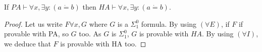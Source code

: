 \begin{theoreme}
    If $PA\vdash \forall x,\exists y:(a\dot{=}b)$ then $HA\vdash \forall x, \exists y: (a\dot{=}b)$.
\end{theoreme}
\begin{proof}
    Let us write $F \forall x,G$ where $G$ is a $\Sigma_1^0$ formula. By using $(\forall E)$, if $F$ if provable with PA, so $G$ too. As $G$ is $\Sigma_1^0$, $G$ is provable with $HA$. By using $(\forall I)$, we deduce that $F$ is provable with HA too.
\end{proof}


